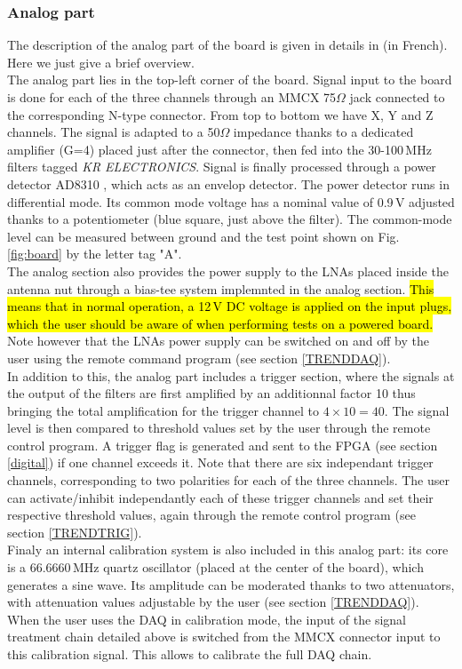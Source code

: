 \subsubsection{Analog part}
\label{analog}
The description of the analog part of the board is given in details in \cite{GP35ana} (in French). Here we just give a brief overview. \\
%
The analog part lies in the top-left corner of the board. Signal input to the board is done for each of the three channels through an MMCX 75$\Omega$ jack connected to the corresponding N-type connector. From top to bottom we have X, Y and Z channels. The signal is adapted to a 50$\Omega$ impedance thanks to a dedicated amplifier (G=4) placed just after the connector, then fed into the 30-100\,MHz filters tagged {\it KR ELECTRONICS}. Signal is finally processed through a power detector AD8310 \cite{AD8310}, which acts as an envelop detector. The power detector runs in differential mode. Its common mode voltage has a nominal value of 0.9\,V adjusted thanks to a potentiometer (blue square, just above the filter). The common-mode level can be measured between ground and the test point shown on Fig. \ref{fig:board} by the letter tag "A". \\
%
The analog section also provides the power supply to the LNAs placed inside the antenna nut through a bias-tee system implemnted in the analog section. \hl{This means that in normal operation, a 12\,V DC voltage is applied on the input plugs, which the user should be aware of when performing tests on a powered board.} Note however that the LNAs power supply can be switched on and off by the user using the remote command program (see section \ref{TRENDDAQ}).  \\
%
In addition to this, the analog part includes a trigger section, where the signals at the output of the filters are first amplified by an additionnal factor 10 thus bringing the total amplification for the trigger channel to $4 \times 10 = 40$. The signal level is then compared to threshold values set by the user through the remote control program. A trigger flag is generated and sent to the FPGA (see section \ref{digital}) if one channel exceeds it. Note that there are six independant trigger channels, corresponding to two polarities for each of the three channels. The user can activate/inhibit independantly each of these trigger channels and set their respective threshold values, again through the remote control program (see section \ref{TRENDTRIG}). \\
%
Finaly an internal calibration system is also included in this analog part: its core is a 66.6660\,MHz quartz oscillator (placed at the center of the board), which generates a sine wave. Its amplitude can be moderated thanks to two attenuators, with attenuation values adjustable by the user (see section \ref{TRENDDAQ}). When the user uses the DAQ in calibration mode, the input of the signal treatment chain detailed above is switched from the MMCX connector input to this calibration signal. This allows to calibrate the full DAQ chain. 
   

